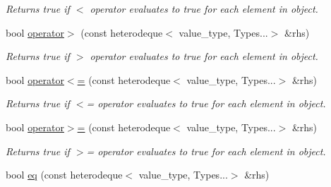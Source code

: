 \begin{DoxyCompactItemize}
\begin{DoxyCompactList}\small\item\em Returns true if $<$ operator evaluates to true for each element in object. \end{DoxyCompactList}\item 
\hypertarget{classheterogeneous_1_1heterodeque_3_01_t_00_01_types_8_8_8_4_ade3d8283efa87cffb0e1badf6bca89dc}{}bool \hyperlink{classheterogeneous_1_1heterodeque_3_01_t_00_01_types_8_8_8_4_ade3d8283efa87cffb0e1badf6bca89dc}{operator$>$} (const heterodeque$<$ value\+\_\+type, Types...$>$ \&rhs)\label{classheterogeneous_1_1heterodeque_3_01_t_00_01_types_8_8_8_4_ade3d8283efa87cffb0e1badf6bca89dc}

\begin{DoxyCompactList}\small\item\em Returns true if $>$ operator evaluates to true for each element in object. \end{DoxyCompactList}\item 
\hypertarget{classheterogeneous_1_1heterodeque_3_01_t_00_01_types_8_8_8_4_a01b5ad6d5bba6eb0b96d28b8c7b6616e}{}bool \hyperlink{classheterogeneous_1_1heterodeque_3_01_t_00_01_types_8_8_8_4_a01b5ad6d5bba6eb0b96d28b8c7b6616e}{operator$<$=} (const heterodeque$<$ value\+\_\+type, Types...$>$ \&rhs)\label{classheterogeneous_1_1heterodeque_3_01_t_00_01_types_8_8_8_4_a01b5ad6d5bba6eb0b96d28b8c7b6616e}

\begin{DoxyCompactList}\small\item\em Returns true if $<$= operator evaluates to true for each element in object. \end{DoxyCompactList}\item 
\hypertarget{classheterogeneous_1_1heterodeque_3_01_t_00_01_types_8_8_8_4_a1fbaa29bfd22120d6e28a119496874bb}{}bool \hyperlink{classheterogeneous_1_1heterodeque_3_01_t_00_01_types_8_8_8_4_a1fbaa29bfd22120d6e28a119496874bb}{operator$>$=} (const heterodeque$<$ value\+\_\+type, Types...$>$ \&rhs)\label{classheterogeneous_1_1heterodeque_3_01_t_00_01_types_8_8_8_4_a1fbaa29bfd22120d6e28a119496874bb}

\begin{DoxyCompactList}\small\item\em Returns true if $>$= operator evaluates to true for each element in object. \end{DoxyCompactList}\item 
\hypertarget{classheterogeneous_1_1heterodeque_3_01_t_00_01_types_8_8_8_4_a4efda77fa958def08a26ebc8434ae982}{}bool \hyperlink{classheterogeneous_1_1heterodeque_3_01_t_00_01_types_8_8_8_4_a4efda77fa958def08a26ebc8434ae982}{eq} (const heterodeque$<$ value\+\_\+type, Types...$>$ \&rhs)\label{classheterogeneous_1_1heterodeque_3_01_t_00_01_types_8_8_8_4_a4efda77fa958def08a26ebc8434ae982}


\end{DoxyCompactItemize}
